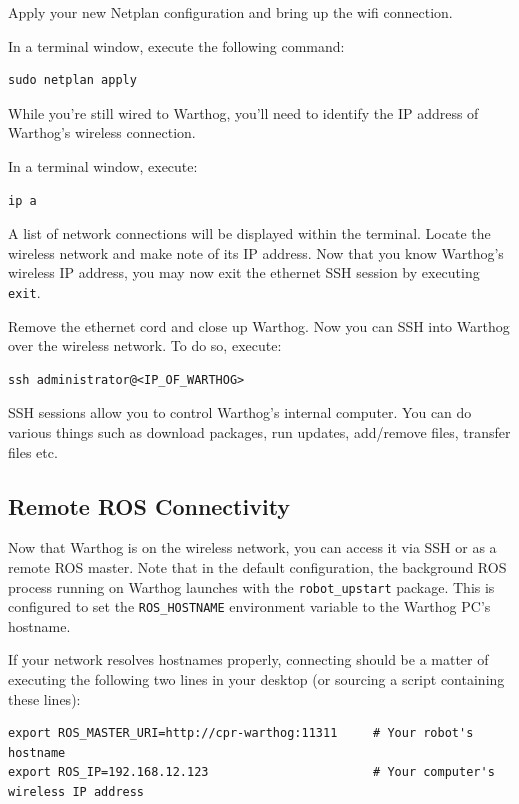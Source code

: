 \documentclass[]{clearpath-latex/clearpath-manual}
\begin{document}
Apply your new Netplan configuration and bring up the wifi connection.

In a terminal window, execute the following command:

\begin{lstlisting}
sudo netplan apply
\end{lstlisting}

While you're still wired to Warthog, you'll need to identify the IP address of Warthog's wireless connection.

In a terminal window, execute:

\begin{lstlisting}
ip a
\end{lstlisting}

A list of network connections will be displayed within the terminal. Locate the wireless network and make note of its IP address. Now that you know Warthog's wireless IP address, you may now exit the ethernet SSH session by executing \lstinline{exit}.

Remove the ethernet cord and close up Warthog.   Now you can SSH into Warthog over the wireless network.  To do so, execute:

\begin{lstlisting}
ssh administrator@<IP_OF_WARTHOG>
\end{lstlisting}

SSH sessions allow you to control Warthog's internal computer.  You can do various things such as download packages, run updates, add/remove files, transfer files etc.

\subsection{Remote ROS Connectivity}

Now that Warthog is on the wireless network, you can access it via SSH or as a remote ROS master. Note that in the default configuration, the background ROS process running on Warthog launches with the \lstinline{robot_upstart} package. This is configured to set the \lstinline{ROS_HOSTNAME} environment variable to the Warthog PC's hostname.

If your network resolves hostnames properly, connecting should be a matter of executing the following two lines in your desktop (or sourcing a script containing these lines):

\begin{lstlisting}
export ROS_MASTER_URI=http://cpr-warthog:11311     # Your robot's hostname
export ROS_IP=192.168.12.123                       # Your computer's wireless IP address
\end{lstlisting}
\end{document}
